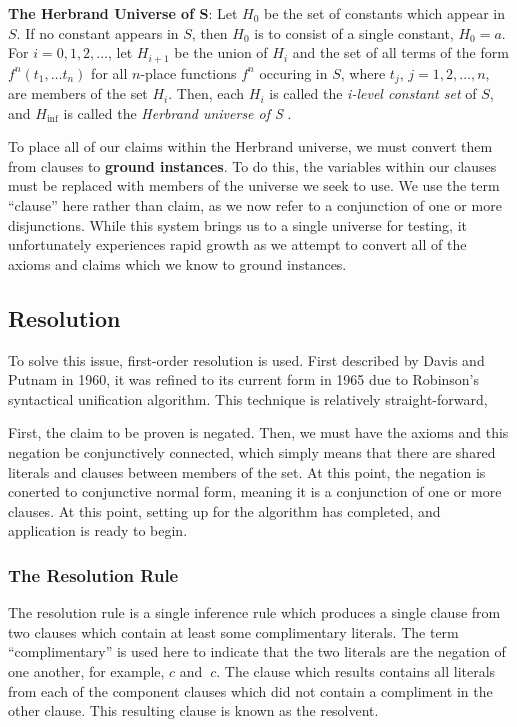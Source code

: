 \begin{definition}

	\textbf{The Herbrand Universe of S}: Let $H_0$ be the set of constants which appear in $S$. If no constant appears in $S$, then $H_0$ is to consist of a single constant, $H_0 = {a}$. For $i = 0, 1, 2, \ldots $, let $H_{i+1}$ be the union of $H_i$ and the set of all terms of the form $f^n(t_1, \ldots t_n)$ for all $n$-place functions $f^n$ occuring in $S$, where $t_j$, $j=1, 2, \ldots , n$, are members of the set $H_i$. Then, each $H_i$ is called the \textit{i-level constant set} of $S$, and $H_{\inf} $ is called the \textit{Herbrand universe of S} \cite{changLee}.


\end{definition}
To place all of our claims within the Herbrand universe, we must convert them from clauses to \textbf{ground instances}. To do this, the variables within our clauses must be replaced with members of the universe we seek to use. We use the term ``clause'' here rather than claim, as we now refer to a conjunction of one or more disjunctions. While this system brings us to a single universe for testing, it unfortunately experiences rapid growth as we attempt to convert all of the axioms and claims which we know to ground instances.

\subsection{Resolution} 

To solve this issue, first-order resolution is used. First described by Davis and Putnam in 1960, it was refined to its current form in 1965 due to Robinson's syntactical unification algorithm. This technique is relatively straight-forward,

First, the claim to be proven is negated. Then, we must have the axioms and this negation be conjunctively connected, which simply means that there are shared literals and clauses between members of the set. At this point, the negation is conerted to conjunctive normal form, meaning it is a conjunction of one or more clauses. At this point, setting up for the algorithm has completed, and application is ready to begin.

\subsubsection{The Resolution Rule}

The resolution rule is a single inference rule which produces a single clause from two clauses which contain at least some complimentary literals. The term ``complimentary'' is used here to indicate that the two literals are the negation of one another, for example, $c$ and $~c$. The clause which results contains all literals from each of the component clauses which did not contain a compliment in the other clause. This resulting clause is known as the resolvent. 

